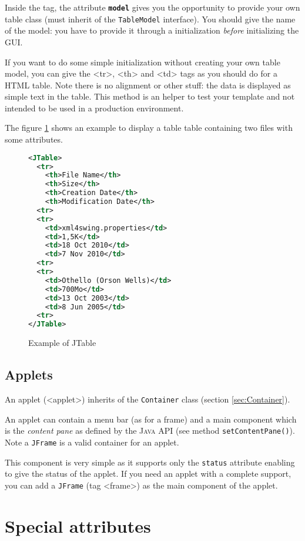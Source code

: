 \documentclass[a4paper,onecolumn,10pt]{book}
\newcommand{\jmethod}[1]{\texttt{\small #1()}}
\newcommand{\jclass}[1]{\texttt{\small #1}}
\newcommand{\JAVA}{\textsc{Java}}
\newcommand{\tag}[1]{\textsf{<#1>}}
\newcommand{\attr}[1]{\texttt{\small \textbf{#1}}}
\begin{document}
Inside the tag, the attribute \attr{model} gives you the
opportunity to provide your own table class (must inherit
of the \jclass{TableModel} interface). You should give the
name of the model: you have to provide it through a initialization
\emph{before} initializing the GUI.

If you want to do some simple initialization without creating
your own table model, you can give the \tag{tr}, \tag{th} and
\tag{td} tags as you should do for a HTML table. Note there is
no alignment or other stuff: the data is displayed as simple
text in the table. This method is an helper to test your template
and not intended to be used in a production environment.

The figure \ref{fig:jtable} shows an example to display
a table table containing two files with some attributes.

\begin{figure}[htb]
\begin{lstlisting}[language=XML]
<JTable>
  <tr>
    <th>File Name</th>
    <th>Size</th>
    <th>Creation Date</th>
    <th>Modification Date</th>
  <tr>
  <tr>
    <td>xml4swing.properties</td>
    <td>1,5K</td>
    <td>18 Oct 2010</td>
    <td>7 Nov 2010</td>
  <tr>
  <tr>
    <td>Othello (Orson Wells)</td>
    <td>700Mo</td>
    <td>13 Oct 2003</td>
    <td>8 Jun 2005</td>
  <tr>
</JTable>
\end{lstlisting}
\caption{Example of JTable}\label{fig:jtable}
\end{figure}


 
\subsection{\label{sec:JApplet}Applets}
An applet (\tag{applet}) inherits of the \jclass{Container} class (section
\ref{sec:Container}).

An applet can contain a menu bar (as for a frame) and a main component
which is the \emph{content pane} as defined by the \JAVA{} API (see
method \jmethod{setContentPane}). Note a \jclass{JFrame} is a valid
container for an applet.

This component is very simple as it supports only the \verb|status|
attribute enabling to give the status of the applet. If you need an applet
with a complete support, you can add a \jclass{JFrame} (tag \tag{frame}) as
the main component of the applet.


\section{Special attributes}
\end{document}
